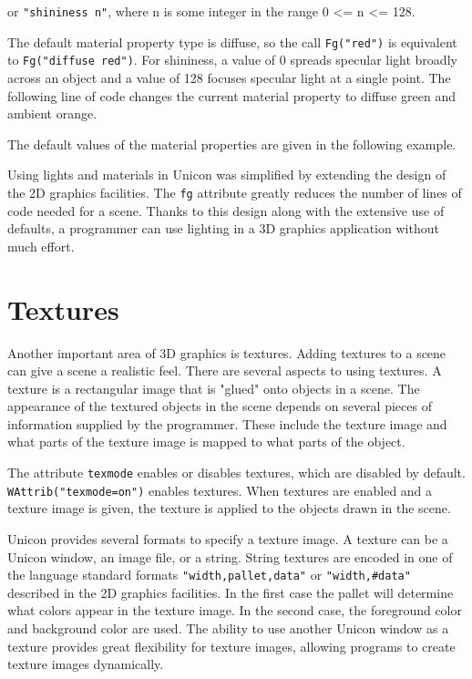 
\noindent
or \texttt{"shininess n"}, where n is some integer
in the range 0 {\textless}= n {\textless}= 128.

The default material property type is diffuse, so the call
\texttt{Fg("red")} is equivalent to \texttt{Fg("diffuse red")}. For
shininess, a value of 0 spreads specular light broadly across an
object and a value of 128 focuses specular light at a single
point. The following line of code changes the current material
property to diffuse green and ambient orange.



\noindent The default values of the material properties are given in the
following example.


Using lights and materials in Unicon was simplified by extending the
design of the 2D graphics facilities. The \texttt{fg} attribute
greatly reduces the number of lines of code needed for a scene. Thanks
to this design along with the extensive use of defaults, a programmer
can use lighting in a 3D graphics application without much effort.

\section{Textures}

Another important area of 3D graphics is textures.  Adding textures to
a scene can give a scene a realistic feel.  There are several aspects
to using textures. A texture is a rectangular image that is "glued"
onto objects in a scene. The appearance of the textured objects in the
scene depends on several pieces of information supplied by the
programmer. These include the texture image and what parts of the
texture image is mapped to what parts of the object.

The attribute \texttt{texmode} enables or disables textures, which are
disabled by default.  \texttt{WAttrib("texmode=on")} enables textures.
When textures are enabled and a texture image is given, the texture is
applied to the objects drawn in the scene.

Unicon provides several formats to specify a texture image. A texture
can be a Unicon window, an image file, or a string. String textures
are encoded in one of the language standard formats
\texttt{"width,pallet,data"} or \texttt{"width,\#data"} described in
the 2D graphics facilities. In the first case the pallet will
determine what colors appear in the texture image. In the second case,
the foreground color and background color are used. The ability to use
another Unicon window as a texture provides great flexibility for
texture images, allowing programs to create texture images
dynamically.

